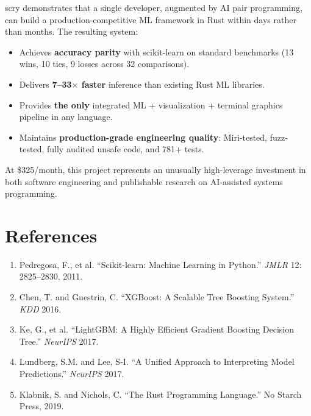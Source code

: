 \documentclass[11pt,a4paper]{article}
\begin{document}
scry demonstrates that a single developer, augmented by AI pair
programming, can build a production-competitive ML framework in Rust
within days rather than months. The resulting system:

\begin{itemize}[nosep]
    \item Achieves \textbf{accuracy parity} with scikit-learn on
          standard benchmarks (13 wins, 10 ties, 9 losses across 32
          comparisons).
    \item Delivers \textbf{7--33$\times$ faster} inference than
          existing Rust ML libraries.
    \item Provides \textbf{the only} integrated ML + visualization +
          terminal graphics pipeline in any language.
    \item Maintains \textbf{production-grade engineering quality}:
          Miri-tested, fuzz-tested, fully audited unsafe code, and
          781+ tests.
\end{itemize}

At \$325/month, this project represents an unusually high-leverage
investment in both software engineering and publishable research on
AI-assisted systems programming.

\section*{References}

\begin{enumerate}[nosep]
    \item Pedregosa, F., et al. ``Scikit-learn: Machine Learning in
          Python.'' \emph{JMLR} 12: 2825--2830, 2011.
    \item Chen, T. and Guestrin, C. ``XGBoost: A Scalable Tree
          Boosting System.'' \emph{KDD} 2016.
    \item Ke, G., et al. ``LightGBM: A Highly Efficient Gradient
          Boosting Decision Tree.'' \emph{NeurIPS} 2017.
    \item Lundberg, S.M. and Lee, S-I. ``A Unified Approach to
          Interpreting Model Predictions.'' \emph{NeurIPS} 2017.
    \item Klabnik, S. and Nichols, C. ``The Rust Programming
          Language.'' No Starch Press, 2019.
\end{enumerate}
\end{document}
